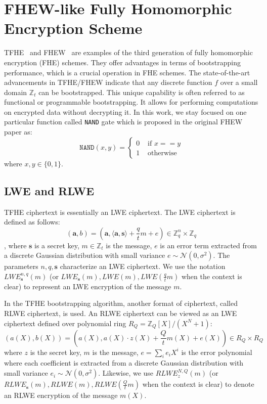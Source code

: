 \documentclass{iacrtrans}
\theoremstyle{plain}
\begin{document}
\section{FHEW-like Fully Homomorphic Encryption Scheme}
TFHE~\cite{chillotti2020tfhe} and FHEW~\cite{ducas2015fhew} are examples of the third generation of fully homomorphic encryption (FHE) schemes. They offer advantages in terms of bootstrapping performance, which is a crucial operation in FHE schemes. The state-of-the-art advancements in TFHE/FHEW indicate that any discrete function $f$ over a small domain $\mathbb{Z}_t$ can be bootstrapped. This unique capability is often referred to as functional or programmable bootstrapping. It allows for performing computations on encrypted data without decrypting it. In this work, we stay focused on one particular function called \texttt{NAND} gate which is proposed in the original FHEW paper as:
\[
    \texttt{NAND}(x,y)=\begin{cases}
    0 & \text{ if } x ==y \\
    1 & \text{ otherwise}
    \end{cases}
\]
where $x,y \in\{0,1\}$.



\subsection{LWE and RLWE}
TFHE ciphertext is essentially an LWE ciphertext. The LWE ciphertext is defined as follows:
\[
(\mathbf{a},b) = (\mathbf{a}, \langle\mathbf{a},\mathbf{s}\rangle+\frac{q}{t}m+e)\in \mathbb{Z}_q^n\times\mathbb{Z}_q
\],
where $\mathbf{s}$ is a secret key, $m\in\mathbb{Z}_t$ is the message, $e$ is an error term extracted from a discrete Gaussian distribution with small variance $e\sim\mathcal{N}(0,\sigma^2)$. 
The parameters $n,q,\mathbf{s}$ characterize an LWE ciphertext. 
We use the notation $LWE_{\mathbf{s}}^{n,q}(m)$ (or $LWE_{\mathbf{s}}(m), LWE(m), LWE(\frac{q}{t}m)$ when the context is clear) to represent an LWE encryption of the message $m$.

In the TFHE bootstrapping algorithm, another format of ciphertext, called RLWE ciphertext, is used. 
An RLWE ciphertext can be viewed as an LWE ciphertext defined over polynomial ring $R_Q=\mathbb{Z}_Q[X]/(X^N+1)$: 
\[
(a(X),b(X))= (a(X), a(X)\cdot z(X)+ \frac{Q}{t}m(X)+e(X))\in R_Q\times R_Q
\]
where $z$ is the secret key, $m$ is the message, $e=\sum_ie_iX^i$ is the error polynomial where each coefficient is extracted from a discrete Gaussian distribution with small variance $e_i\sim\mathcal{N}(0,\sigma^2)$. 
Likewise, we use $RLWE_z^{N,Q}(m)$ (or $RLWE_{\mathbf{s}}(m), RLWE(m), RLWE(\frac{Q}{t}m)$ when the context is clear) to denote an RLWE encryption of the message $m(X)$. 
\end{document}
